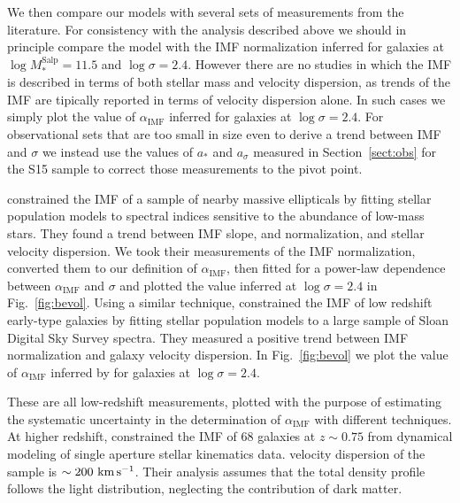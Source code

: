 \documentclass[usenatbib]{mnras}
\def\msalp{M_*^{\mathrm{Salp}}}
\def\aimf{\alpha_{\mathrm{IMF}}}
\def\Sref#1{Section~\ref{#1}\xspace}
\def\Fref#1{Fig.~\ref{#1}\xspace}
\begin{document}
We then compare our models with several sets of measurements from the
literature.  For consistency with the analysis described above we
should in principle compare the model with the IMF normalization
inferred for galaxies at $\log{\msalp}=11.5$ and $\log{\sigma}=2.4$.
However there are no studies in which the IMF is described in terms of
both stellar mass and velocity dispersion, as trends of the IMF are
tipically reported in terms of velocity dispersion alone.  In such
cases we simply plot the value of $\aimf$ inferred for galaxies at
$\log{\sigma}=2.4$.  For observational sets that are too small in size
even to derive a trend between IMF and $\sigma$ we instead use the
values of $a_*$ and $a_\sigma$ measured in \Sref{sect:obs} for the S15
sample to correct those measurements to the pivot point.

\citet{CvD12} constrained the IMF of a sample of nearby massive
ellipticals by fitting stellar population models to spectral indices
sensitive to the abundance of low-mass stars.  They found a trend
between IMF slope, and normalization, and stellar velocity
dispersion. We took their measurements of the IMF normalization,
converted them to our definition of $\aimf$, then fitted
for a power-law dependence between $\aimf$ and $\sigma$ and plotted
the value inferred at $\log{\sigma}=2.4$ in \Fref{fig:bevol}.  Using a
similar technique, \citet{Spi++14} constrained the IMF of low redshift
early-type galaxies by fitting stellar population models to a large
sample of Sloan Digital Sky Survey spectra.  They measured a positive
trend between IMF normalization and galaxy velocity dispersion. In
\Fref{fig:bevol} we plot the value of $\aimf$ inferred by
\citet{Spi++14} for galaxies at $\log{\sigma} = 2.4$.

These are all low-redshift measurements, plotted with the purpose of
estimating the systematic uncertainty in the determination of $\aimf$
with different techniques.  At higher redshift, \citet{S+C14}
constrained the IMF of 68 galaxies at $z\sim0.75$ from dynamical
modeling of single aperture stellar kinematics data. %
velocity dispersion of the \citet{S+C14} sample is $\sim
200~\rm{km\,}\rm{s}^{-1}$.  Their analysis assumes that the total
density profile follows the light distribution, neglecting the
contribution of dark matter.

\end{document}
